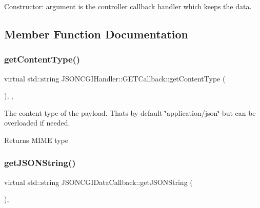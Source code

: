 Constructor\+: argument is the controller callback handler which keeps the data. 

\subsection{Member Function Documentation}
\mbox{\label{classJSONCGIHandler_1_1GETCallback_a4e1fee495ddeb4e24eaa5b8e767ea838}} 
\subsubsection{\texorpdfstring{get\+Content\+Type()}{getContentType()}}
{\footnotesize\ttfamily virtual std\+::string J\+S\+O\+N\+C\+G\+I\+Handler\+::\+G\+E\+T\+Callback\+::get\+Content\+Type (\begin{DoxyParamCaption}{ }\end{DoxyParamCaption})\hspace{0.3cm}{\ttfamily [inline]}, {\ttfamily [virtual]}, {\ttfamily [inherited]}}

The content type of the payload. That\textquotesingle{}s by default \char`\"{}application/json\char`\"{} but can be overloaded if needed. \begin{DoxyReturn}{Returns}
M\+I\+ME type 
\end{DoxyReturn}
\mbox{\label{classJSONCGIDataCallback_a3ca67affb4f88f8c5a1f7f04b4bbc0ef}} 
\subsubsection{\texorpdfstring{get\+J\+S\+O\+N\+String()}{getJSONString()}}
{\footnotesize\ttfamily virtual std\+::string J\+S\+O\+N\+C\+G\+I\+Data\+Callback\+::get\+J\+S\+O\+N\+String (\begin{DoxyParamCaption}{ }\end{DoxyParamCaption})\hspace{0.3cm}{\ttfamily [inline]}, {\ttfamily [virtual]}}

